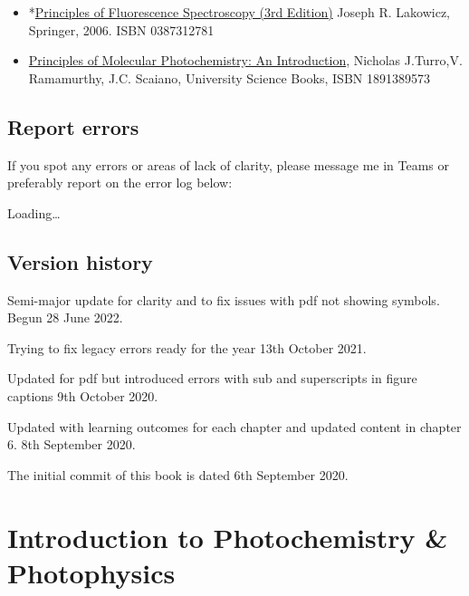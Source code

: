 \documentclass[
]{book}
\begin{document}
\begin{itemize}
\item
  *\href{https://link.springer.com/book/10.1007/978-0-387-46312-4}{Principles of Fluorescence Spectroscopy (3rd Edition)} Joseph R. Lakowicz, Springer, 2006. ISBN 0387312781
\item
  \href{https://bath-ac-primo.hosted.exlibrisgroup.com/primo-explore/fulldisplay?docid=44BAT_ALMA_DS2129552010002761\&context=L\&vid=44BAT_VU1\&lang=en_US\&search_scope=CSCOP_44BAT_DEEP\&adaptor=Local\%20Search\%20Engine\&tab=local\&query=any,contains,principles\%20of\%20molecular\%20photochemistry\%20ramamurthy\&offset=0\&pcAvailability=false}{Principles of Molecular Photochemistry: An Introduction}, Nicholas J.Turro,V. Ramamurthy, J.C. Scaiano, University Science Books, ISBN 1891389573
\end{itemize}

\hypertarget{report-errors}{%
\section{Report errors}\label{report-errors}}

If you spot any errors or areas of lack of clarity, please message me in Teams or preferably report on the error log below:

Loading\ldots{}

\hypertarget{version-history}{%
\section*{Version history}\label{version-history}}

Semi-major update for clarity and to fix issues with pdf not showing symbols. Begun 28 June 2022.

Trying to fix legacy errors ready for the year 13th October 2021.

Updated for pdf but introduced errors with sub and superscripts in figure captions 9th October 2020.

Updated with learning outcomes for each chapter and updated content in chapter 6. 8th September 2020.

The initial commit of this book is dated 6th September 2020.

\hypertarget{ch:Intro}{%
\chapter{Introduction to Photochemistry \& Photophysics}\label{ch:Intro}}
\end{document}
